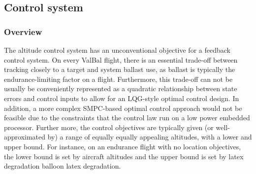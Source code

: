 \documentclass[11pt]{scrartcl} %
\begin{document}
\subsection{Control system}
\subsubsection{Overview}
The altitude control system has an unconventional objective for a feedback control system. On every ValBal flight, there is an essential trade-off between tracking closely to a target and system ballast use, as ballast is typically the endurance-limiting factor on a flight. Furthermore, this trade-off can not be usually be conveniently represented as a quadratic relationship between state errors and control inputs to allow for an LQG-style optimal control design. In addition, a more complex SMPC-based optimal control approach would not be feasible due to the constraints that the control law run on a low power embedded processor. Further more, the control objectives are typically given (or well-approximated by) a range of equally equally appealing altitudes, with a lower and upper bound. For instance, on an endurance flight with no location objectives, the lower bound is set by aircraft altitudes and the upper bound is set by latex degradation balloon latex degradation. 
\end{document}
